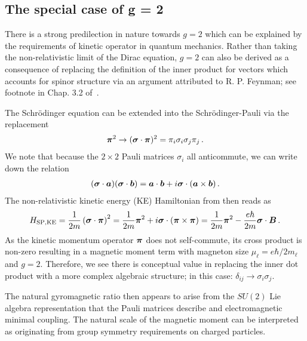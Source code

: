 
\subsection{The special case of g = 2}
\label{sec:unique}
There is a strong predilection in nature towards $g\!=\!2$ which can be explained by the requirements of kinetic operator in quantum mechanics. Rather than taking the non-relativistic limit of the Dirac equation, $g\!=\!2$ can also be derived as a consequence of replacing the definition of the inner product for vectors which accounts for spinor structure via an argument attributed to R. P. Feynman; see footnote in Chap. 3.2 of~\cite{sakurai1967advanced}.

The Schr{\"o}dinger equation can be extended into the Schr{\"o}dinger-Pauli  via the replacement
\begin{alignat}{1}
	\label{nat:0}
    \boldsymbol{\pi}^{2}\rightarrow(\boldsymbol{\sigma}\cdot\boldsymbol{\pi})^{2}=\pi_{i}\sigma_{i}\sigma_{j}\pi_{j}\,.
\end{alignat}
We note that because the $2\times2$ Pauli matrices $\sigma_{i}$ all anticommute, we can write down the relation
\begin{alignat}{1}
	\label{nat:1}
    (\boldsymbol{\sigma}\cdot\boldsymbol{a})(\boldsymbol{\sigma}\cdot\boldsymbol{b})=\boldsymbol{a}\cdot\boldsymbol{b}+i\boldsymbol{\sigma}\cdot(\boldsymbol{a}\times\boldsymbol{b})\,.
\end{alignat}
The non-relativistic kinetic energy (KE) Hamiltonian from  then reads as
\begin{align}
	\label{nat:2}
    {H}_{\mathrm{SP,KE}}=\frac{1}{2m}\left(\boldsymbol{\sigma}\cdot\boldsymbol{\pi}\right)^{2}=\frac{1}{2m}\boldsymbol{\pi}^{2}+i\boldsymbol{\sigma}\cdot(\boldsymbol{\pi}\times\boldsymbol{\pi})=\frac{1}{2m}\boldsymbol{\pi}^{2}-\frac{e\hbar}{2m}\boldsymbol{\sigma}\cdot\boldsymbol{B}\,.
\end{align}
As the kinetic momentum operator $\boldsymbol{\pi}$ does not self-commute, its cross product is non-zero resulting in a magnetic moment term with magneton size $\mu_{\ell}=e\hbar/2m_{\ell}$ and $g\!=\!2$. Therefore, we see there is conceptual value in replacing the inner dot product with a more complex algebraic structure; in this case: $\delta_{ij}\rightarrow\sigma_{i}\sigma_{j}$.

The natural gyromagnetic ratio then appears to arise from the $SU(2)$ Lie algebra representation that the Pauli matrices describe and electromagnetic minimal coupling. The natural scale of the magnetic moment can be interpreted as originating from group symmetry requirements on charged particles.

